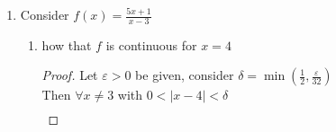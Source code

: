 \documentclass[12pt]{article}
\begin{document}
\begin{enumerate}
\begin{enumerate}
\begin{proof}
                Let $\varepsilon > 0$ be given, and $c \in (-3,3)$ \\
                Consider $\delta = \min(\frac{3-c}{2}, \frac{\varepsilon{(3-c)}^2}{2})$ \\
                Then $\forall x \in (-3,3)$ with $0 < |x-c| < \delta$
                \begin{align*}
                    |f(x)-f(c)| &= \bigg| \frac{x+3}{x^2-9} - \frac{c+3}{c^2-9} \bigg| \\
                    &= \bigg| \frac{1}{x-3} - \frac{1}{c-3} \bigg| \\
                    &= \bigg| \frac{c-3-x+3}{(x-3)(c-3)} \bigg| \\
                    &= \frac{|c-x|}{|x-3||c-3|} \\
                    &< \delta \frac{1}{|x-3||c-3|} \\
                    &= \delta \frac{1}{(3-x)(3-c)} && (x \in (-3,3) \ \text{and} \ c \in (-3,3)) \\
                    &< \frac{2\delta}{{(3-c)}^{2}} && \text{(Note)}
                    &= \varepsilon
                \end{align*}
                Note:
                \begin{gather*}
                    |x-c| < \frac{3-c}{2} \\
                    \frac{c-3}{2} < x-c < \frac{3-c}{2} \\
                    \frac{3c-3}{2} < x < \frac{c+3}{2} \\
                    \frac{3c-9}{2} < x-3 < \frac{c-3}{2} \\
                    \frac{9-3c}{2} > 3-x > \frac{3-c}{2} \\
                    3-x > \frac{3-c}{2}
                \end{gather*}
            \end{proof}
	      \end{enumerate}
          \item Consider $f(x) = \frac{5x+1}{x-3}$
          \begin{enumerate}
              \item how that $f$ is continuous for $x=4$
              \begin{proof}
                  Let $\varepsilon > 0$ be given, consider $\delta = \min(\frac{1}{2}, \frac{\varepsilon}{32{}})$ \\
                  Then $\forall x \neq 3$ with $0 < |x-4| < \delta$
                  \begin{align*}

\end{align*}
\end{proof}
\end{enumerate}
\end{enumerate}
\end{document}
